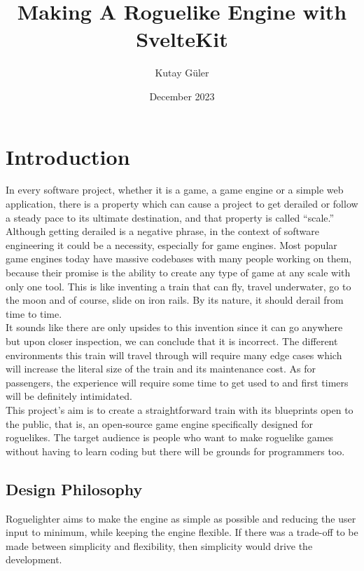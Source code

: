 \documentclass{article}
\begin{document}
\title{Making A Roguelike Engine with SvelteKit}
\author{Kutay Güler}
\date{December 2023}


\maketitle
\tableofcontents

\section{Introduction}
In every software project, whether it is a game, a game engine or a simple web application, there is a property which can cause a project to get derailed or follow a steady pace to its ultimate destination, and that property is called “scale.”\\ 

Although getting derailed is a negative phrase, in the context of software engineering it could be a necessity, especially for game engines. Most popular game engines today have massive codebases with many people working on them, because their promise is the ability to create any type of game at any scale with only one tool. This is like inventing a train that can fly, travel underwater, go to the moon and of course, slide on iron rails. By its nature, it should derail from time to time.\\

It sounds like there are only upsides to this invention since it can go anywhere but upon closer inspection, we can conclude that it is incorrect. The different environments this train will travel through will require many edge cases which will increase the literal size of the train and its maintenance cost. As for passengers, the experience will require some time to get used to and first timers will be definitely intimidated.\\ 

This project’s aim is to create a straightforward train with its blueprints open to the public, that is, an open-source game engine specifically designed for roguelikes. The target audience is people who want to make roguelike games without having to learn coding but there will be grounds for programmers too.\\ 

\subsection{Design Philosophy}
Roguelighter aims to make the engine as simple as possible and reducing the user input to minimum, while keeping the engine flexible. If there was a trade-off to be made between simplicity and flexibility, then simplicity would drive the development. 
\end{document}
